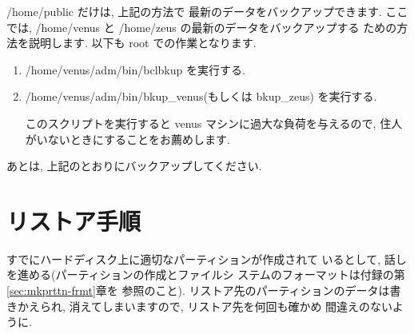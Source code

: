 \documentclass{jarticle}
\begin{document}
/home/public だけは, 上記の方法で 最新のデータをバックアップできます.
ここでは, /home/venus と /home/zeus の最新のデータをバックアップする
ための方法を説明します. 以下も root での作業となります.

\begin{enumerate}
\item /home/venus/adm/bin/bclbkup を実行する.
\item /home/venus/adm/bin/bkup\_venus(もしくは bkup\_zeus) を実行する.

      このスクリプトを実行すると venus マシンに過大な負荷を与えるので,
      住人がいないときにすることをお薦めします.
\end{enumerate}
あとは, 上記のとおりにバックアップしてください.

\section{リストア手順}

すでにハードディスク上に適切なパーティションが作成されて
いるとして, 話しを進める(パーティションの作成とファイルシ
ステムのフォーマットは付録の第 \ref{sec:mkprttn-frmt}章を
参照のこと). リストア先のパーティションのデータは書きかえられ,
消えてしまいますので, リストア先を何回も確かめ 間違えのないように.
\end{document}
